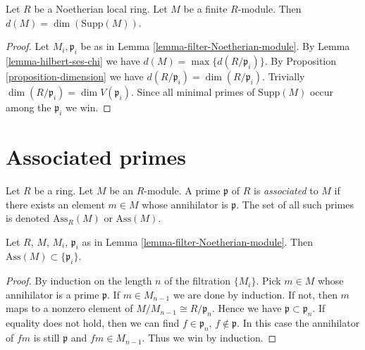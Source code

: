 \begin{lemma}
\label{lemma-support-dimension-d}
Let $R$ be a Noetherian local ring.
Let $M$ be a finite $R$-module.
Then $d(M) = \dim(\text{Supp}(M))$.
\end{lemma}

\begin{proof}
Let $M_i, \mathfrak p_i$ be as in Lemma \ref{lemma-filter-Noetherian-module}.
By Lemma \ref{lemma-hilbert-ses-chi} we have
$d(M) = \max \{ d(R/\mathfrak p_i) \}$. By
Proposition \ref{proposition-dimension} we have
$d(R/\mathfrak p_i) = \dim(R/\mathfrak p_i)$.
Trivially $\dim(R/\mathfrak p_i) = \dim V(\mathfrak p_i)$.
Since all minimal primes of $\text{Supp}(M)$ occur among
the $\mathfrak p_i$ we win.
\end{proof}











\section{Associated primes}
\label{section-ass}

\begin{definition}
\label{definition-associated}
Let $R$ be a ring. Let $M$ be an $R$-module.
A prime $\mathfrak p$ of $R$ is {\it associated} to $M$
if there exists an element $m \in M$ whose annihilator
is $\mathfrak p$.
The set of all such primes is denoted $\text{Ass}_R(M)$
or $\text{Ass}(M)$.
\end{definition}

\begin{lemma}
\label{lemma-ass-filter}
Let $R$, $M$, $M_i$, $\mathfrak p_i$ as in
Lemma \ref{lemma-filter-Noetherian-module}.
Then $\text{Ass}(M) \subset \{\mathfrak p_i\}$.
\end{lemma}

\begin{proof}
By induction on the length $n$ of the filtration $\{ M_i \}$.
Pick $m \in M$ whose annihilator is a prime $\mathfrak p$.
If $m \in M_{n-1}$ we are done by induction. If not,
then $m$ maps to a nonzero element of $M/M_{n-1} \cong
R/\mathfrak p_n$. Hence we have $\mathfrak p \subset \mathfrak p_n$.
If equality does not hold, then we can find $f \in \mathfrak p_n$,
$f \not\in \mathfrak p$. In this case the annihilator of $fm$ is still
$\mathfrak p$ and $fm \in M_{n-1}$. Thus we win by induction.
\end{proof}

